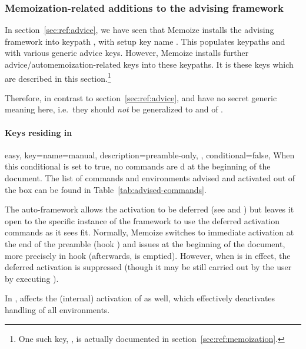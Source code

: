 \documentclass[a4paper,11pt]{article}
\begin{document}
\endgroup %

\subsubsection{Memoization-related additions to the advising framework}
\label{sec:ref:advice:memoization}

In section~\ref{sec:ref:advice}, we have seen that Memoize installs the
advising framework into keypath , with setup key name
.  This populates keypaths  and
 with various generic advice keys.  However, Memoize
installs further advice\slash automemoization-related keys into these keypaths.
It is these keys which are described in this section.\footnote{One such key,
  , is actually documented in
  section~\ref{sec:ref:memoization}.}

Therefore, in contrast to section~\ref{sec:ref:advice},  and
 have no secret generic meaning here, i.e.\ they should \emph{not}
be generalized to  and  of
.

\paragraph{Keys residing in }

\begingroup
\setlength{}%

\begin{doc}{easy,
    key={name=manual, description={preamble-only,{ }}, conditional=false},
  }
  When this conditional is set to true, no commands are d at
  the beginning of the document.  The list of commands and environments advised
  and activated out of the box can be found in Table~\ref{tab:advised-commands}.

  The auto-framework allows the activation to be deferred (see
   and ) but leaves it
  open to the specific instance of the framework to use the deferred activation
  commands as it sees fit.  Normally, Memoize switches to immediate activation
  at the end of the preamble (hook ) and issues
   at the beginning of the document, more precisely
  in hook  (afterwards,  is
  emptied).  However, when  is in effect, the deferred
  activation is suppressed (though it may be still carried out by the user by
  executing ).

  In ,  affects the (internal) activation of
   as well, which effectively deactivates handling of all environments.
\end{doc}
\end{document}
